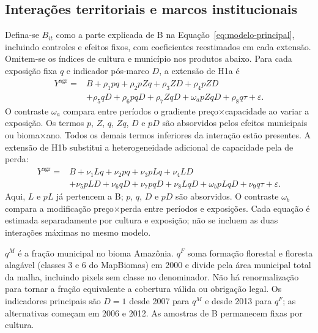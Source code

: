 \subsection{Interações territoriais e marcos institucionais}

Defina-se $B_{it}$ como a parte explicada de B na Equação~\eqref{eq:modelo-principal}, incluindo controles e efeitos fixos, com coeficientes reestimados em cada extensão. Omitem-se os índices de cultura e município nos produtos abaixo. Para cada exposição fixa $q$ e indicador pós-marco $D$, a extensão de H1a é
\begin{equation}
\begin{aligned}
Y^{\mathrm{agr}}={}&B+\rho_1pq+\rho_2pZq+\rho_3ZD+\rho_4pZD\\
&+\rho_5qD+\rho_6pqD+\rho_7ZqD+\omega_a pZqD
+\rho_8q\tau+\varepsilon.
\end{aligned}
\label{eq:instituicoes-h1a}
\end{equation}
O contraste $\omega_a$ compara entre períodos o gradiente preço×capacidade ao variar a exposição. Os termos $p$, $Z$, $q$, $Zq$, $D$ e $pD$ são absorvidos pelos efeitos municipais ou bioma×ano. Todos os demais termos inferiores da interação estão presentes. A extensão de H1b substitui a heterogeneidade adicional de capacidade pela de perda:
\begin{equation}
\begin{aligned}
Y^{\mathrm{agr}}={}&B+\nu_1Lq+\nu_2pq+\nu_3pLq+\nu_4LD\\
&+\nu_5pLD+\nu_6qD+\nu_7pqD+\nu_8LqD
+\omega_b pLqD+\nu_9q\tau+\varepsilon.
\end{aligned}
\label{eq:instituicoes-h1b}
\end{equation}
Aqui, $L$ e $pL$ já pertencem a B; $p$, $q$, $D$ e $pD$ são absorvidos. O contraste $\omega_b$ compara a modificação preço×perda entre períodos e exposições. Cada equação é estimada separadamente por cultura e exposição; não se incluem as duas interações máximas no mesmo modelo.

$q^M$ é a fração municipal no bioma Amazônia. $q^F$ soma formação florestal e floresta alagável (classes 3 e 6 do MapBiomas) em 2000 e divide pela área municipal total da malha, incluindo pixels sem classe no denominador. Não há renormalização para tornar a fração equivalente a cobertura válida ou obrigação legal. Os indicadores principais são $D=1$ desde 2007 para $q^M$ e desde 2013 para $q^F$; as alternativas começam em 2006 e 2012. As amostras de B permanecem fixas por cultura.

